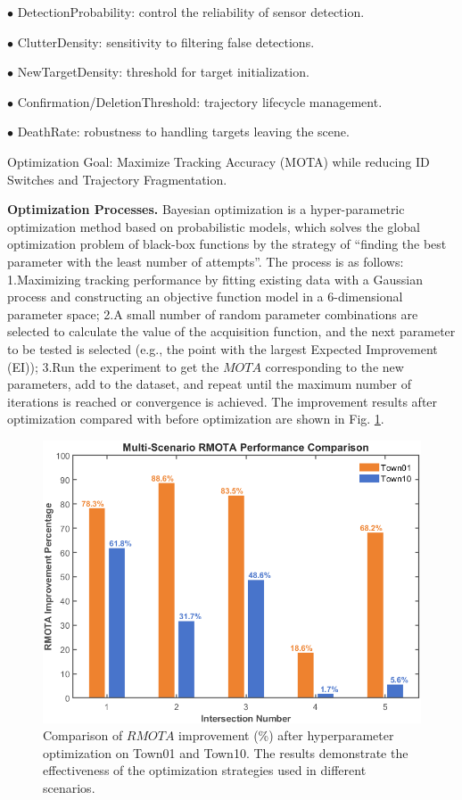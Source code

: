 \documentclass[lettersize,journal]{IEEEtran}
\begin{document}
\(\bullet\) DetectionProbability: control the reliability of sensor detection.

\(\bullet\) ClutterDensity: sensitivity to filtering false detections.

\(\bullet\) NewTargetDensity: threshold for target initialization.

\(\bullet\) Confirmation/DeletionThreshold: trajectory lifecycle management.

\(\bullet\) DeathRate: robustness to handling targets leaving the scene.

Optimization Goal: Maximize Tracking Accuracy (MOTA) while reducing ID Switches and Trajectory Fragmentation.

\textbf{Optimization Processes.}
Bayesian optimization is a hyper-parametric optimization method based on probabilistic models, which solves the global optimization problem of black-box functions by the strategy of “finding the best parameter with the least number of attempts”.
The process is as follows:
1.Maximizing tracking performance by fitting existing data with a Gaussian process and constructing an objective function model in a 6-dimensional parameter space; 
2.A small number of random parameter combinations are selected to calculate the value of the acquisition function, and the next parameter to be tested is selected (e.g., the point with the largest Expected Improvement (EI)); 
3.Run the experiment to get the \(MOTA\) corresponding to the new parameters, add to the dataset, and repeat until the maximum number of iterations is reached or convergence is achieved.
The improvement results after optimization compared with before optimization are shown in Fig. \ref{fig:4}.   
\begin{figure}[t]
	\centering
	\includegraphics[width=\linewidth]{picture/picture4.png} 
	\caption{Comparison of \(RMOTA\) improvement (\%) after hyperparameter optimization on Town01 and Town10. The results demonstrate the effectiveness of the optimization strategies used in different scenarios.} 
	\label{fig:4} 
\end{figure}
\end{document}
